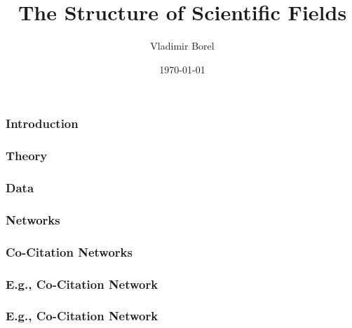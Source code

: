 \documentclass[xcolor=dvipsnames,notes]{beamer}
\title{The Structure of Scientific Fields}
\author{Vladimir Borel}
\institute{University of California, Riverside}
\date{\today}
\begin{document}
\frame{\titlepage}

\begin{frame}
\frametitle{Introduction}

\end{frame}

\begin{frame}
\frametitle{Theory}

\end{frame}

\begin{frame}
\frametitle{Data}

\end{frame}

% 

\begin{frame}
\frametitle{Networks}

\end{frame}





\begin{frame}
\frametitle{Co-Citation Networks}
\end{frame}

\begin{frame}
\frametitle{E.g., Co-Citation Network}
\end{frame}

\begin{frame}
\frametitle{E.g., Co-Citation Network}
\end{frame}
\end{document}
